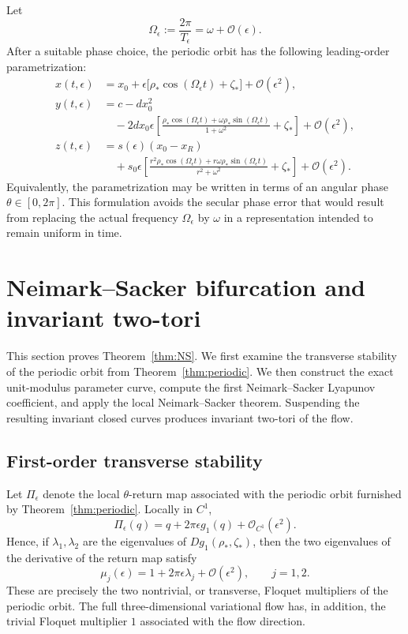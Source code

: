 \documentclass[11pt]{amsart}
\theoremstyle{remark}
\newcommand{\cO}{\mathcal{O}}
\begin{document}
Let
\[
 \Omega_\epsilon:=\frac{2\pi}{T_\epsilon}
 =\omega+\cO(\epsilon).
\]
After a suitable phase choice, the periodic orbit has the following
leading-order parametrization:
\begin{equation}\label{eq:periodic-parametrization}
\begin{aligned}
x(t,\epsilon)
&=x_0+\epsilon\bigl[\rho_*\cos(\Omega_\epsilon t)+\zeta_*\bigr]
  +\cO(\epsilon^2),\\
y(t,\epsilon)
&=c-dx_0^2\\
&\quad-2dx_0\epsilon
\left[
\frac{\rho_*\cos(\Omega_\epsilon t)
+\omega\rho_*\sin(\Omega_\epsilon t)}{1+\omega^2}
+\zeta_*
\right]+\cO(\epsilon^2),\\
z(t,\epsilon)
&=s(\epsilon)(x_0-x_R)\\
&\quad+s_0\epsilon
\left[
\frac{r^2\rho_*\cos(\Omega_\epsilon t)
+r\omega\rho_*\sin(\Omega_\epsilon t)}{r^2+\omega^2}
+\zeta_*
\right]+\cO(\epsilon^2).
\end{aligned}
\end{equation}
Equivalently, the parametrization may be written in terms of an angular
phase \(\theta\in[0,2\pi]\).  This formulation avoids the secular phase
error that would result from replacing the actual frequency
\(\Omega_\epsilon\) by \(\omega\) in a representation intended to remain
uniform in time.

\section{Neimark--Sacker bifurcation and invariant two-tori}

This section proves Theorem~\ref{thm:NS}.  We first examine the transverse
stability of the periodic orbit from Theorem~\ref{thm:periodic}.  We then
construct the exact unit-modulus parameter curve, compute the first
Neimark--Sacker Lyapunov coefficient, and apply the local
Neimark--Sacker theorem.  Suspending the resulting invariant closed curves
produces invariant two-tori of the flow.

\subsection{First-order transverse stability}
\label{subsec:first-transverse-stability}

Let $\Pi_\epsilon$ denote the local $\theta$-return map associated with
the periodic orbit furnished by Theorem~\ref{thm:periodic}. Locally in
$C^1$,
\begin{equation}
\label{eq:Poincare-first}
 \Pi_\epsilon(q)
 =
 q+2\pi\epsilon g_1(q)+\cO_{C^1}(\epsilon^2).
\end{equation}
Hence, if $\lambda_1,\lambda_2$ are the eigenvalues of
$Dg_1(\rho_*,\zeta_*)$, then the two eigenvalues of the derivative of the
return map satisfy
\begin{equation}
\label{eq:multipliers-first}
 \mu_j(\epsilon)
 =
 1+2\pi\epsilon\lambda_j+\cO(\epsilon^2),
 \qquad j=1,2.
\end{equation}
These are precisely the two nontrivial, or transverse, Floquet
multipliers of the periodic orbit. The full three-dimensional variational
flow has, in addition, the trivial Floquet multiplier $1$ associated with
the flow direction.
\end{document}

